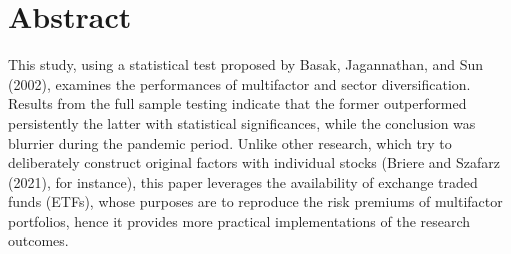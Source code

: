 \chapter*{Abstract}

This study, using a statistical test proposed by Basak, Jagannathan, and Sun (2002), examines the performances of multifactor and sector diversification. Results from the full sample testing indicate that the former outperformed persistently the latter with statistical significances, while the conclusion was blurrier during the pandemic period. Unlike other research, which try to deliberately construct original factors with individual stocks (Briere and Szafarz (2021), for instance), this paper leverages the availability of exchange traded funds (ETFs), whose purposes are to reproduce the risk premiums of multifactor portfolios, hence it provides more practical implementations of the research outcomes. 